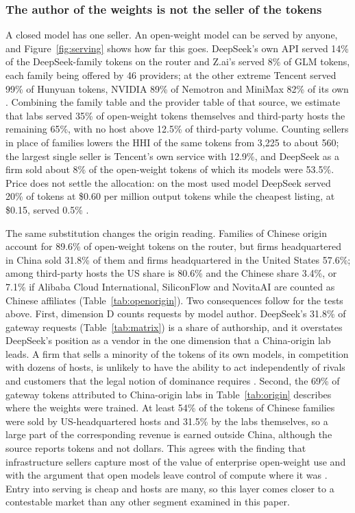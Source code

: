 \documentclass[11pt]{article}
\begin{document}
\subsubsection{The author of the weights is not the seller of the tokens} A closed model has one seller. An open-weight model can be served by anyone, and Figure~\ref{fig:serving} shows how far this goes. DeepSeek's own API served 14\% of the DeepSeek-family tokens on the router and Z.ai's served 8\% of GLM tokens, each family being offered by 46 providers; at the other extreme Tencent served 99\% of Hunyuan tokens, NVIDIA 89\% of Nemotron and MiniMax 82\% of its own \cite{amcompute2026providers}. Combining the family table and the provider table of that source, we estimate that labs served 35\% of open-weight tokens themselves and third-party hosts the remaining 65\%, with no host above 12.5\% of third-party volume. Counting sellers in place of families lowers the HHI of the same tokens from 3{,}225 to about 560; the largest single seller is Tencent's own service with 12.9\%, and DeepSeek as a firm sold about 8\% of the open-weight tokens of which its models were 53.5\%. Price does not settle the allocation: on the most used model DeepSeek served 20\% of tokens at \$0.60 per million output tokens while the cheapest listing, at \$0.15, served 0.5\% \cite{amcompute2026providers}.

The same substitution changes the origin reading. Families of Chinese origin account for 89.6\% of open-weight tokens on the router, but firms headquartered in China sold 31.8\% of them and firms headquartered in the United States 57.6\%; among third-party hosts the US share is 80.6\% and the Chinese share 3.4\%, or 7.1\% if Alibaba Cloud International, SiliconFlow and NovitaAI are counted as Chinese affiliates (Table~\ref{tab:openorigin}). Two consequences follow for the tests above. First, dimension D counts requests by model author. DeepSeek's 31.8\% of gateway requests (Table~\ref{tab:matrix}) is a share of authorship, and it overstates DeepSeek's position as a vendor in the one dimension that a China-origin lab leads. A firm that sells a minority of the tokens of its own models, in competition with dozens of hosts, is unlikely to have the ability to act independently of rivals and customers that the legal notion of dominance requires \cite{ec2009guidance}. Second, the 69\% of gateway tokens attributed to China-origin labs in Table~\ref{tab:origin} describes where the weights were trained. At least 54\% of the tokens of Chinese families were sold by US-headquartered hosts and 31.5\% by the labs themselves, so a large part of the corresponding revenue is earned outside China, although the source reports tokens and not dollars. This agrees with the finding that infrastructure sellers capture most of the value of enterprise open-weight use \cite{futurum2026open} and with the argument that open models leave control of compute where it was \cite{widder2024open}. Entry into serving is cheap and hosts are many, so this layer comes closer to a contestable market \cite{baumol1982contestable} than any other segment examined in this paper.
\end{document}
